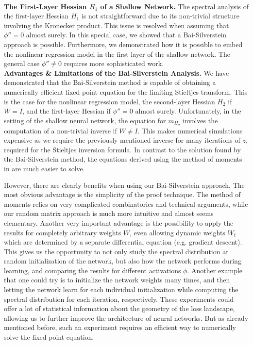\documentclass{article}
\begin{document}
\bigskip
\bigskip
\\
\textbf{The First-Layer Hessian $H_1$ of a Shallow Network.} The spectral analysis of the first-layer Hessian $H_1$ is not straightforward due to its non-trivial structure involving the Kronecker product. This issue is resolved when assuming that $\phi''=0$ almost surely. In this special case, we showed that a Bai-Silverstein approach is possible. Furthermore, we demonstrated how it is possible to embed the nonlinear regression model in the first layer of the shallow network. The general case $\phi''\neq0$ requires more sophisticated work.
\bigskip
\bigskip
\\
\textbf{Advantages \& Limitations of the Bai-Silverstein Analysis.} We have demonstrated that the Bai-Silverstein method is capable of obtaining a numerically efficient fixed point equation for the limiting Stieltjes transform. This is the case for the nonlinear regression model, the second-layer Hessian $H_2$ if $W=I$, and the first-layer Hessian if $\phi''=0$ almost surely. Unfortunately, in the setting of the shallow neural network, the equation for $m_{H_2}$ involves the computation of a non-trivial inverse if $W\neq I$. This makes numerical simulations expensive as we require the previously mentioned inverse for many iterations of $z$, required for the Stieltjes inversion formula. In contrast to the solution found by the Bai-Silverstein method, the equations derived using the method of moments in \cite{benigni, piccolo} are much easier to solve.
\par
However, there are clearly benefits when using our Bai-Silverstein approach. The most obvious advantage is the simplicity of the proof technique. The method of moments relies on very complicated combinatorics and technical arguments, while our random matrix approach is much more intuitive and almost seems elementary. Another very important advantage is the possibility to apply the results for completely arbitrary weights $W$, even allowing dynamic weights $W_t$ which are determined by a separate differential equation (e.g. gradient descent). This gives us the opportunity to not only study the spectral distribution at random initialization of the network, but also how the network performs during learning, and comparing the results for different activations $\phi$. Another example that one could try is to initialize the network weights many times, and then letting the network learn for each individual initialization while computing the spectral distribution for each iteration, respectively. These experiments could offer a lot of statistical information about the geometry of the loss landscape, allowing us to further improve the architecture of neural networks. But as already mentioned before, such an experiment requires an efficient way to numerically solve the fixed point equation.
\end{document}
